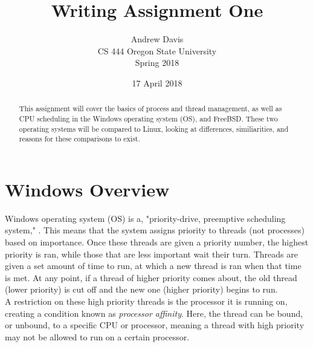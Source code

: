 \documentclass[onecolumn, draftclsnofoot,10pt, compsoc]{IEEEtran}
\title{Writing Assignment One}
\author{Andrew Davis\\CS 444 Oregon State University\\Spring 2018}
\date {17 April 2018}
\begin{document}
\begin{titlepage}
	\maketitle
    \begin{singlespace}
        \begin{abstract}
		This assignment will cover the basics of process and thread management, as well as CPU scheduling in the Windows operating system (OS), and FreeBSD.
		These two operating systems will be compared to Linux, looking at differences, similiarities, and reasons for these comparisons to exist.
        	
        \end{abstract}     
    \end{singlespace}
\end{titlepage}
\newpage
{}

\clearpage

\section{Windows Overview}
	Windows operating system (OS) is a, "priority-drive, preemptive scheduling system," \cite{windowswebsite}.
	This means that the system assigns priority to threads (not processes) based on importance.
	Once these threads are given a priority number, the highest priority is ran, while those that are less important wait their turn.
	Threads are given a set amount of time to run, at which a new thread is ran when that time is met.
	At any point, if a thread of higher priority comes about, the old thread (lower priority) is cut off and the new one (higher priority) begins to run.\\

	A restriction on these high priority threads is the processor it is running on, creating a condition known as \textit{processor affinity}.
	Here, the thread can be bound, or unbound, to a specific CPU or processor, meaning a thread with high priority may not be allowed to run on a certain processor.\\
\end{document}
